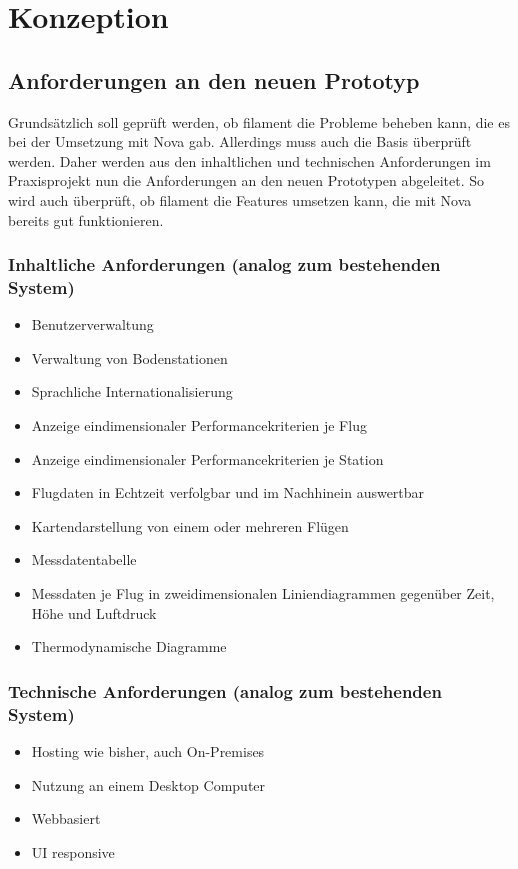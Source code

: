 \section{Konzeption}

\subsection{Anforderungen an den neuen Prototyp}

Grundsätzlich soll geprüft werden, ob filament die Probleme beheben kann, die es bei der Umsetzung mit Nova gab.
Allerdings muss auch die Basis überprüft werden.
Daher werden aus den inhaltlichen und technischen Anforderungen im Praxisprojekt nun die Anforderungen an den neuen Prototypen abgeleitet.
So wird auch überprüft, ob filament die Features umsetzen kann, die mit Nova bereits gut funktionieren.

\subsubsection{Inhaltliche Anforderungen (analog zum bestehenden System)}
\begin{itemize}
    \item Benutzerverwaltung
    \item Verwaltung von Bodenstationen
    \item Sprachliche Internationalisierung
    \item Anzeige eindimensionaler Performancekriterien je Flug
    \item Anzeige eindimensionaler Performancekriterien je Station
    \item Flugdaten in Echtzeit verfolgbar und im Nachhinein auswertbar
    \item Kartendarstellung von einem oder mehreren Flügen
    \item Messdatentabelle
    \item Messdaten je Flug in zweidimensionalen Liniendiagrammen gegenüber Zeit, Höhe und Luftdruck
    \item Thermodynamische Diagramme
\end{itemize}

\subsubsection{Technische Anforderungen (analog zum bestehenden System)}
\begin{itemize}
    \item Hosting wie bisher, auch On-Premises
    \item Nutzung an einem Desktop Computer
    \item Webbasiert
    \item UI responsive
\end{itemize}

